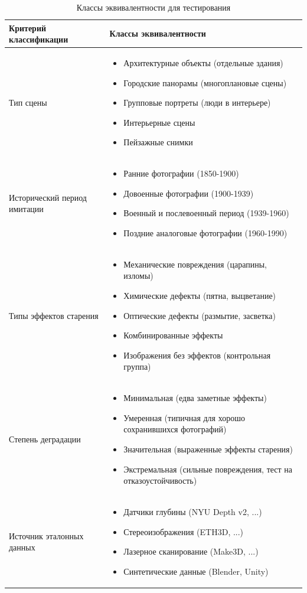 \begin{table}[H]
\centering
\caption{Классы эквивалентности для тестирования}
\label{tab:equivalence-classes}
\begin{tabular}{|p{3cm}|p{9cm}|}
\hline
\textbf{Критерий классификации} & \textbf{Классы эквивалентности} \\
\hline
Тип сцены &
\begin{itemize}
    \item Архитектурные объекты (отдельные здания)
    \item Городские панорамы (многоплановые сцены)
    \item Групповые портреты (люди в интерьере)
    \item Интерьерные сцены
    \item Пейзажные снимки
\end{itemize} \\
\hline
Исторический период имитации &
\begin{itemize}
    \item Ранние фотографии (1850-1900)
    \item Довоенные фотографии (1900-1939)
    \item Военный и послевоенный период (1939-1960)
    \item Поздние аналоговые фотографии (1960-1990)
\end{itemize} \\
\hline
Типы эффектов старения &
\begin{itemize}
    \item Механические повреждения (царапины, изломы)
    \item Химические дефекты (пятна, выцветание)
    \item Оптические дефекты (размытие, засветка)
    \item Комбинированные эффекты
    \item Изображения без эффектов (контрольная группа)
\end{itemize} \\
\hline
Степень деградации &
\begin{itemize}
    \item Минимальная (едва заметные эффекты)
    \item Умеренная (типичная для хорошо сохранившихся фотографий)
    \item Значительная (выраженные эффекты старения)
    \item Экстремальная (сильные повреждения, тест на отказоустойчивость)
\end{itemize} \\
\hline
Источник эталонных данных &
\begin{itemize}
    \item Датчики глубины (NYU Depth v2, ...)
    \item Стереоизображения (ETH3D, ...)
    \item Лазерное сканирование (Make3D, ...)
    \item Синтетические данные (Blender, Unity)
\end{itemize} \\
\hline
\end{tabular}
\end{table}

